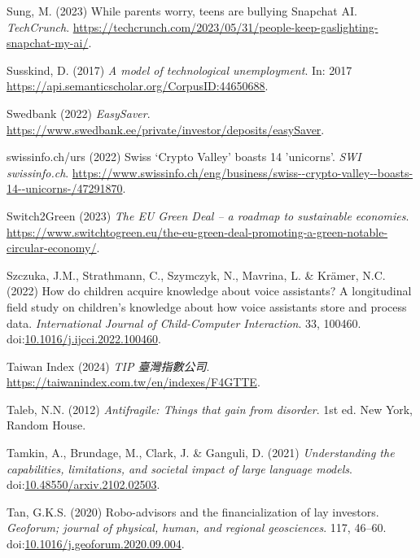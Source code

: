 \documentclass[
  letterpaper,
  DIV=11,
  numbers=noendperiod]{scrartcl}
\newlength{\cslhangindent}
\newenvironment{CSLReferences}[2] %
 {\begin{list}{}{%
  \setlength{\itemindent}{0pt}
  \setlength{\leftmargin}{0pt}
  \setlength{\parsep}{0pt}
  \ifodd #1
   \setlength{\leftmargin}{\cslhangindent}
   \setlength{\itemindent}{-1\cslhangindent}
  \fi
  \setlength{\itemsep}{#2\baselineskip}}}
 {\end{list}}
\begin{document}
\begin{CSLReferences}{0}{1}
Sung, M. (2023) While parents worry, teens are bullying {Snapchat AI}.
\emph{TechCrunch}.
\url{https://techcrunch.com/2023/05/31/people-keep-gaslighting-snapchat-my-ai/}.

Susskind, D. (2017) \emph{A model of technological unemployment}. In:
2017 \url{https://api.semanticscholar.org/CorpusID:44650688}.

Swedbank (2022) \emph{{EasySaver}}.
\url{https://www.swedbank.ee/private/investor/deposits/easySaver}.

swissinfo.ch/urs (2022) Swiss {`{Crypto Valley}'} boasts 14 'unicorns'.
\emph{SWI swissinfo.ch}.
\url{https://www.swissinfo.ch/eng/business/swiss--crypto-valley--boasts-14--unicorns-/47291870}.

Switch2Green (2023) \emph{The {EU Green Deal} -- a roadmap to
sustainable economies}.
\url{https://www.switchtogreen.eu/the-eu-green-deal-promoting-a-green-notable-circular-economy/}.

Szczuka, J.M., Strathmann, C., Szymczyk, N., Mavrina, L. \& Krämer, N.C.
(2022) How do children acquire knowledge about voice assistants? {A}
longitudinal field study on children's knowledge about how voice
assistants store and process data. \emph{International Journal of
Child-Computer Interaction}. 33, 100460.
doi:\href{https://doi.org/10.1016/j.ijcci.2022.100460}{10.1016/j.ijcci.2022.100460}.

Taiwan Index (2024) \emph{{TIP} 臺灣指數公司}.
\url{https://taiwanindex.com.tw/en/indexes/F4GTTE}.

Taleb, N.N. (2012) \emph{Antifragile: Things that gain from disorder}.
1st ed. New York, Random House.

Tamkin, A., Brundage, M., Clark, J. \& Ganguli, D. (2021)
\emph{Understanding the capabilities, limitations, and societal impact
of large language models}.
doi:\href{https://doi.org/10.48550/arxiv.2102.02503}{10.48550/arxiv.2102.02503}.

Tan, G.K.S. (2020) Robo-advisors and the financialization of lay
investors. \emph{Geoforum; journal of physical, human, and regional
geosciences}. 117, 46--60.
doi:\href{https://doi.org/10.1016/j.geoforum.2020.09.004}{10.1016/j.geoforum.2020.09.004}.


\end{CSLReferences}
\end{document}
